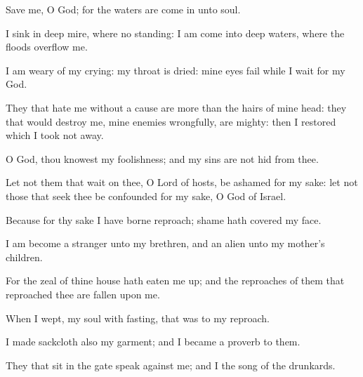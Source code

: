 {\Q {}Save me, O
God; for the
waters are
come in unto
{}
soul.


\par }{\Q {}I
sink in
deep
mire, where
{} no
standing: I am
come into
deep
waters, where the
floods
overflow me.


\par }{\Q {}I am
weary of my
crying: my
throat is
dried: mine
eyes
fail while I
wait for my
God.


\par }{\Q {}They that
hate me without a
cause are
more than the
hairs of mine
head: they that would
destroy me,
{} mine
enemies
wrongfully, are
mighty: then I
restored
{} which I took not
away.


\par }{\Q {}O
God, thou
knowest my
foolishness; and my
sins are not
hid from thee.


\par }{\Q {}Let not them that
wait on thee, O
Lord
{} of
hosts, be
ashamed for my sake: let not those that
seek thee be
confounded for my sake, O
God of
Israel.


\par }{\Q {}Because for thy sake I have
borne
reproach;
shame hath
covered my
face.


\par }{\Q {}I am become a
stranger unto my
brethren, and an
alien unto my
mother’s
children.


\par }{\Q {}For the
zeal of thine
house hath eaten me
up; and the
reproaches of them that
reproached thee are
fallen upon me.


\par }{\Q {}When I
wept,
{} my
soul with
fasting, that was to my
reproach.


\par }{\Q {}I
made
sackcloth also my
garment; and I became a
proverb to them.


\par }{\Q {}They that sit
in the
gate
speak against me; and I
{} the
song of the
drunkards.


\par }{\BB \par }
